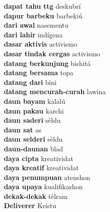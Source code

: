 \textbf{ dapat tahu ttg  } deskubrí \\
\textbf{ dapur barbeku  } barbekiú \\
\textbf{ dari awal  } nasementu \\
\textbf{ dari lahir  } indígena \\
\textbf{ dasar aktivis  } activismo \\
\textbf{ dasar tindak cergas  } activismo \\
\textbf{ datang berkunjung  } bishitá \\
\textbf{ datang bersama  } topa \\
\textbf{ datang dari  } bini \\
\textbf{ datang mencurah-curah  } lawina \\
\textbf{ daun bayam  } kalalú \\
\textbf{ daun pakau  } karchi \\
\textbf{ daun saderi  } sèldu \\
\textbf{ daun sat  } as \\
\textbf{ daun selderi  } sèldu \\
\textbf{ daun-daunan  } blad \\
\textbf{ daya cipta  } kreatividat \\
\textbf{ daya kreatif  } kreatividat \\
\textbf{ daya penumpuan  } atenshon \\
\textbf{ daya upaya  } kualifikashon \\
\textbf{ dekak-dekak  } tèlram \\
\textbf{ Deliverer  } Kristu \\
